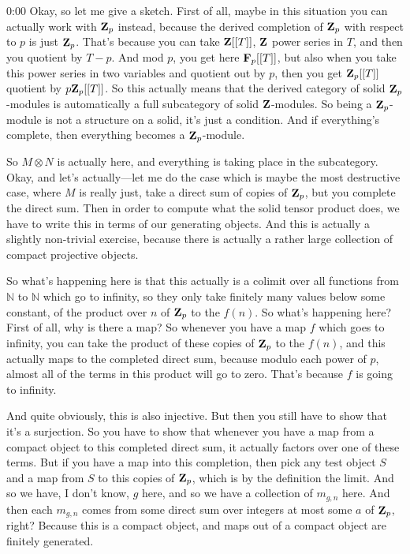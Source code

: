 \begin{unfinished}{0:00}
Okay, so let me give a sketch. First of all, maybe in this situation you can actually work with $\mathbf Z_p$ instead, because the derived completion of $\mathbf Z_p$ with respect to $p$ is just $\mathbf Z_p$. That's because you can take $\mathbf Z[[T]]$, $\mathbf Z$ power series in $T$, and then you quotient by $T-p$. And mod $p$, you get here $\mathbf F_p[[T]]$, but also when you take this power series in two variables and quotient out by $p$, then you get $\mathbf Z_p[[T]]$ quotient by $p\mathbf Z_p[[T]]$. So this actually means that the derived category of solid $\mathbf Z_p$-modules is automatically a full subcategory of solid $\mathbf Z$-modules. So being a $\mathbf Z_p$-module is not a structure on a solid, it's just a condition. And if everything's complete, then everything becomes a $\mathbf Z_p$-module.

So $M \otimes N$ is actually here, and everything is taking place in the subcategory. Okay, and let's actually---let me do the case which is maybe the most destructive case, where $M$ is really just, take a direct sum of copies of $\mathbf Z_p$, but you complete the direct sum. Then in order to compute what the solid tensor product does, we have to write this in terms of our generating objects. And this is actually a slightly non-trivial exercise, because there is actually a rather large collection of compact projective objects.

So what's happening here is that this actually is a colimit over all functions from $\mathbb{N}$ to $\mathbb{N}$ which go to infinity, so they only take finitely many values below some constant, of the product over $n$ of $\mathbf Z_p$ to the $f(n)$. So what's happening here? First of all, why is there a map? So whenever you have a map $f$ which goes to infinity, you can take the product of these copies of $\mathbf Z_p$ to the $f(n)$, and this actually maps to the completed direct sum, because modulo each power of $p$, almost all of the terms in this product will go to zero. That's because $f$ is going to infinity.

And quite obviously, this is also injective. But then you still have to show that it's a surjection. So you have to show that whenever you have a map from a compact object to this completed direct sum, it actually factors over one of these terms. But if you have a map into this completion, then pick any test object $S$ and a map from $S$ to this copies of $\mathbf Z_p$, which is by the definition the limit. And so we have, I don't know, $g$ here, and so we have a collection of $m_{g,n}$ here. And then each $m_{g,n}$ comes from some direct sum over integers at most some $a$ of $\mathbf Z_p$, right? Because this is a compact object, and maps out of a compact object are finitely generated.


\end{unfinished}
